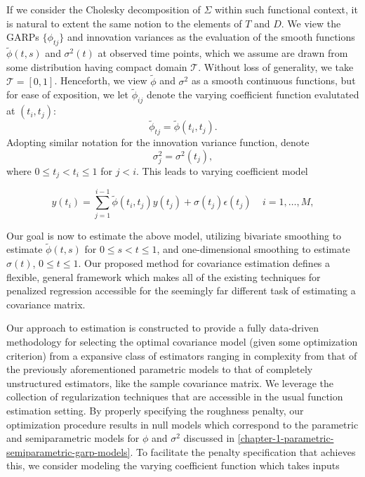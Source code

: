 \documentclass[12pt]{article}
\theoremstyle{definition}
\begin{document}
If we consider the Cholesky decomposition of $\Sigma$ within such functional context, it is natural to extent the same notion to the elements of $T$ and $D$. We view the GARPs $\lbrace \phi_{tj} \rbrace$ and innovation variances as the evaluation of the smooth functions $\tilde{\phi}\left(t,s\right)$ and $\sigma^2\left(t\right)$ at observed time points, which we assume  are drawn from some distribution having compact domain $\mathcal{T}$. Without loss of generality, we take $\mathcal{T} = \left[0,1\right]$. Henceforth, we view $\tilde{\phi}$ and $\sigma^2$ as a smooth continuous functions, but for ease of exposition, we let $\tilde{\phi}_{ij}$ denote the varying coefficient function evalutated at $\left(t_i,t_j\right)$: 
\[
\tilde{\phi}_{tj} = \tilde{\phi}\left(t_{i},t_{j}\right). 
\]
Adopting similar notation for the innovation variance function, denote
\[
\sigma_{j}^2 = \sigma^2\left(t_{j}\right),
\]
where $0 \le t_{j} < t_{i} \le 1$ for $j < i$. This leads to varying coefficient model

\begin{equation}  \label{eq:cholesky-regression-model-1} 
y\left(t_{i} \right)  = \sum_{j=1}^{i-1} \tilde{\phi}\left(t_{i} ,t_{j}\right) y\left(t_{j}\right) + \sigma\left(t_{j}\right)\epsilon\left({t_j}\right) \;\;\;\; i=1,\dots, M, 
\end{equation}
\noindent

Our goal is now to estimate the above model, utilizing bivariate smoothing to estimate $\tilde{\phi}\left(t,s\right)$ for $0 \le s < t \le 1$,  and one-dimensional smoothing to estimate $\sigma\left(t \right)$, $0 \le t \le 1$. Our proposed method for covariance estimation defines a flexible, general framework which makes all of the existing techniques for penalized regression accessible for the seemingly far different task of estimating a covariance matrix.

\bigskip

Our approach to estimation is constructed to provide a fully data-driven methodology for selecting the optimal covariance model (given some optimization criterion) from a expansive class of estimators ranging in complexity from that of the previously aforementioned parametric models to that of completely unstructured estimators, like the sample covariance matrix. We leverage the collection of regularization techniques that are accessible in the usual function estimation setting. By properly specifying the roughness penalty, our optimization procedure results in null models which correspond to the parametric and semiparametric models for $\phi$ and $\sigma^2$ discussed in \ref{chapter-1-parametric-semiparametric-garp-models}. To facilitate the penalty specification that achieves this, we consider modeling the varying coefficient function which takes inputs
\end{document}
